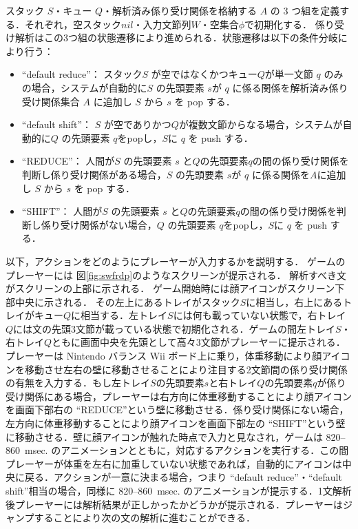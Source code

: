 \documentclass[japanese]{jnlp_1.4}
\begin{document}
スタック $S$・キュー $Q$・解析済み係り受け関係を格納する $A$ の 3 つ組を定義する．それぞれ，空スタック$nil$・入力文節列$W$・空集合$\phi$で初期化する．
係り受け解析はこの3つ組の状態遷移により進められる．状態遷移は以下の条件分岐により行う：
\begin{itemize}
\item ``default reduce''： スタック$S$ が空ではなくかつキュー$Q$が単一文節 $q$ のみの場合，システムが自動的に$S$ の先頭要素 $s$が $q$ に係る関係を解析済み係り受け関係集合 $A$ に追加し $S$ から $s$ を pop する．
\item ``default shift''： $S$ が空でありかつ$Q$が複数文節からなる場合，システムが自動的に$Q$ の先頭要素 $q$をpopし，$S$に $q$ を push する．
\item ``REDUCE''： 人間が$S$ の先頭要素 $s$ と$Q$の先頭要素$q$の間の係り受け関係を判断し係り受け関係がある場合，$S$ の先頭要素 $s$が $q$ に係る関係を$A$に追加し $S$ から $s$ を pop する．
\item ``SHIFT''： 人間が$S$ の先頭要素 $s$ と$Q$の先頭要素$q$の間の係り受け関係を判断し係り受け関係がない場合，$Q$ の先頭要素 $q$をpopし，$S$に $q$ を push する．
\end{itemize}
以下，アクションをどのようにプレーヤーが入力するかを説明する．
ゲームのプレーヤーには 図\ref{fig:swfrdp}のようなスクリーンが提示される．
解析すべき文がスクリーンの上部に示される．
ゲーム開始時には顔アイコンがスクリーン下部中央に示される．
その左上にあるトレイがスタック$S$に相当し，右上にあるトレイがキュー$Q$に相当する．左トレイ$S$には何も載っていない状態で，右トレイ$Q$には文の先頭3文節が載っている状態で初期化される．ゲームの間左トレイ$S$・右トレイ$Q$ともに画面中央を先頭として高々3文節がプレーヤーに提示される．
プレーヤーは Nintendo バランス Wii ボード上に乗り，体重移動により顔アイコンを移動させ左右の壁に移動させることにより注目する2文節間の係り受け関係の有無を入力する．もし左トレイ$S$の先頭要素$s$と右トレイ$Q$の先頭要素$q$が係り受け関係にある場合，プレーヤーは右方向に体重移動することにより顔アイコンを画面下部右の ``REDUCE''という壁に移動させる．係り受け関係にない場合，左方向に体重移動することにより顔アイコンを画面下部左の ``SHIFT''という壁に移動させる．壁に顔アイコンが触れた時点で入力と見なされ，ゲームは 820--860~msec. のアニメーションとともに，対応するアクションを実行する．この間プレーヤーが体重を左右に加重していない状態であれば，自動的にアイコンは中央に戻る．アクションが一意に決まる場合，つまり ``default reduce''・``default shift''相当の場合，同様に 820--860~msec. のアニメーションが提示する．1文解析後プレーヤーには解析結果が正しかったかどうかが提示される．プレーヤーはジャンプすることにより次の文の解析に進むことができる．
\end{document}
